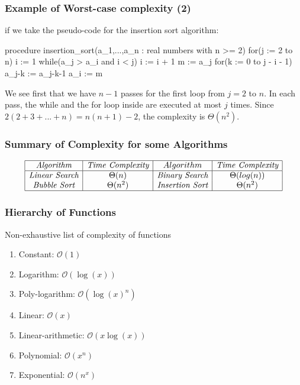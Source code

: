 \documentclass{article}
\begin{document}
\subsubsection{Example of Worst-case complexity (2)} if we take the pseudo-code for the insertion sort algorithm:
\begin{mylisting}
	procedure insertion_sort(a_1,...,a_n : real numbers with n >= 2)
		for(j := 2 to n)
			i := 1
			while(a_j > a_i and i < j)
				i := i + 1
			m := a_j
			for(k := 0 to j - i - 1)
				a_{j-k} := a_{j-k-1}
			a_i := m				
\end{mylisting}
We see first that we have $ n - 1 $ passes for the first loop from $ j = 2 $ to $ n $. In each pass, the while and the for loop inside are executed at most $ j $ times. Since $ 2(2+3+...+n) = n(n + 1) - 2 $, the complexity is $ \Theta(n^2) $.

\subsubsection{Summary of Complexity for some Algorithms}
\renewcommand{\arraystretch}{1.5} %
\begin{center} %
\[ %
\begin{array}{|c|c|c|c|} \hline %
\textit{Algorithm} & \textit{Time Complexity} & Algorithm & \textit{Time Complexity}\\ \hline
\textit{Linear Search} & \Theta(n) & \textit{Binary Search} & \Theta(log(n))\\
\textit{Bubble Sort} & \Theta(n^2) & \textit{Insertion Sort} & \Theta(n^2)\\
\hline
\end{array} %
\] %
\end{center}

\subsubsection{Hierarchy of Functions} Non-exhaustive list of complexity of functions
\begin{enumerate}
\item Constant: $ \mathcal{O}(1) $
\item Logarithm: $ \mathcal{O}(\log(x)) $
\item Poly-logarithm: $ \mathcal{O}(\log(x)^n) $
\item Linear: $ \mathcal{O}(x) $
\item Linear-arithmetic: $ \mathcal{O}(x\log(x)) $
\item Polynomial: $ \mathcal{O}(x^n) $
\item Exponential: $ \mathcal{O}(n^x) $
\end{enumerate}
\end{document}
